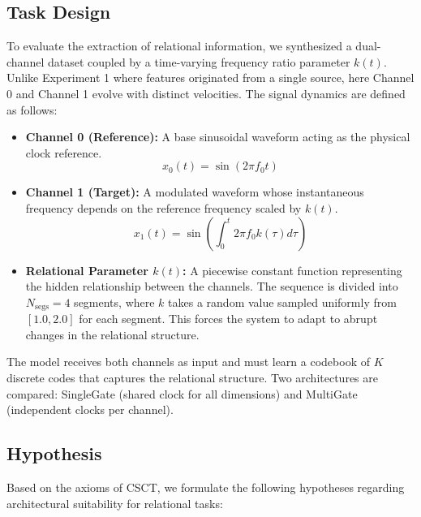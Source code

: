 \documentclass{article}
\begin{document}
\subsection{Task Design}
To evaluate the extraction of relational information, we synthesized a dual-channel dataset coupled by a time-varying frequency ratio parameter $k(t)$. Unlike Experiment 1 where features originated from a single source, here Channel 0 and Channel 1 evolve with distinct velocities. The signal dynamics are defined as follows:

\begin{itemize}
    \item \textbf{Channel 0 (Reference):} A base sinusoidal waveform acting as the physical clock reference.
    \begin{equation}
    x_{0}(t) = \sin(2\pi f_{0}t)
    \end{equation}
    \item \textbf{Channel 1 (Target):} A modulated waveform whose instantaneous frequency depends on the reference frequency scaled by $k(t)$.
    \begin{equation}
    x_{1}(t) = \sin\left(\int_{0}^{t}2\pi f_{0}k(\tau)d\tau\right)
    \end{equation}
    \item \textbf{Relational Parameter $k(t)$:} A piecewise constant function representing the hidden relationship between the channels. The sequence is divided into $N_{\text{segs}}=4$ segments, where $k$ takes a random value sampled uniformly from $[1.0, 2.0]$ for each segment. This forces the system to adapt to abrupt changes in the relational structure.
\end{itemize}

The model receives both channels as input and must learn a codebook of $K$ discrete codes that captures the relational structure. Two architectures are compared: SingleGate (shared clock for all dimensions) and MultiGate (independent clocks per channel).

\subsection{Hypothesis}
Based on the axioms of CSCT, we formulate the following hypotheses regarding architectural suitability for relational tasks:
\end{document}
